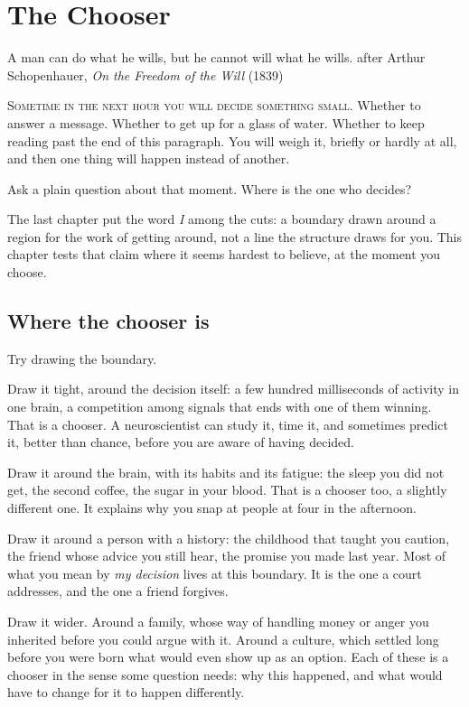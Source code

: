 \chapter{The Chooser}

\chapterepigraph
{A man can do what he wills, but he cannot will what he wills.}
{after Arthur Schopenhauer, \textit{On the Freedom of the Will} (1839)}

\noindent \textsc{Sometime in the next hour you will decide something small.} Whether to answer a message. Whether to get up for a glass of water. Whether to keep reading past the end of this paragraph. You will weigh it, briefly or hardly at all, and then one thing will happen instead of another.

Ask a plain question about that moment. Where is the one who decides?

The last chapter put the word \emph{I} among the cuts: a boundary drawn around a region for the work of getting around, not a line the structure draws for you. This chapter tests that claim where it seems hardest to believe, at the moment you choose.

\section*{Where the chooser is}

Try drawing the boundary.

Draw it tight, around the decision itself: a few hundred milliseconds of activity in one brain, a competition among signals that ends with one of them winning. That is a chooser. A neuroscientist can study it, time it, and sometimes predict it, better than chance, before you are aware of having decided.

Draw it around the brain, with its habits and its fatigue: the sleep you did not get, the second coffee, the sugar in your blood. That is a chooser too, a slightly different one. It explains why you snap at people at four in the afternoon.

Draw it around a person with a history: the childhood that taught you caution, the friend whose advice you still hear, the promise you made last year. Most of what you mean by \emph{my decision} lives at this boundary. It is the one a court addresses, and the one a friend forgives.

Draw it wider. Around a family, whose way of handling money or anger you inherited before you could argue with it. Around a culture, which settled long before you were born what would even show up as an option. Each of these is a chooser in the sense some question needs: why this happened, and what would have to change for it to happen differently.

